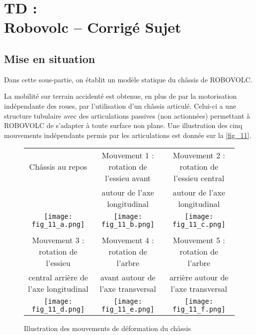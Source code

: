 \chapter*{TD  :\\ 
Robovolc -- \ifprof Corrigé \else Sujet \fi}

\iflivret {} \else
\ifprof  {} \else \fi
\fi

\setcounter{question}{0}
%

\section*{Mise en situation}


\begin{obj}
Dans cette sous-partie, on établit un modèle statique du châssis de ROBOVOLC.
\end{obj}

La mobilité sur terrain accidenté est obtenue, en plus de par la motorisation indépendante des
roues, par l'utilisation d'un châssis articulé. Celui-ci a une structure tubulaire avec des articulations
passives (non actionnées) permettant à ROBOVOLC de s'adapter à toute surface non plane. Une
illustration des cinq mouvements indépendants permis par les articulations est donnée sur la
\autoref{fig_11}.





\begin{figure*}[!h]
\centering
\begin{tabular}{ccc}
Châssis au repos & 
Mouvement 1 : rotation de l'essieu avant &
Mouvement 2 : rotation de l'essieu central\\
 & 
autour de l'axe longitudinal &
autour de l'axe longitudinal \\
\texttt{[image: fig\_11\_a.png]} & 
\texttt{[image: fig\_11\_b.png]} & 
\texttt{[image: fig\_11\_c.png]} \\\\
Mouvement 3 : rotation de l'essieu &
Mouvement 4 : rotation de l'arbre &
Mouvement 5 : rotation de l'arbre \\
central arrière de l'axe longitudinal &
avant autour de l'axe transversal &
arrière autour de l'axe transversal \\
\texttt{[image: fig\_11\_d.png]} & 
\texttt{[image: fig\_11\_e.png]} & 
\texttt{[image: fig\_11\_f.png]} \\
\end{tabular}
\caption{Illustration des mouvements de déformation du châssis\label{fig_11}}
\end{figure*}

